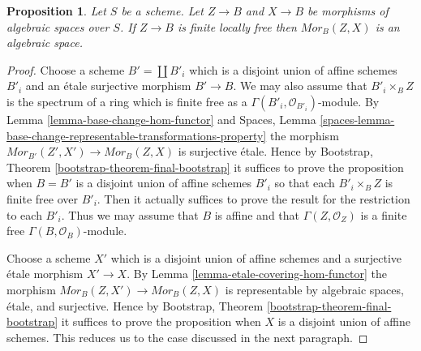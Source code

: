 \documentclass{stacks-project}
\theoremstyle{plain}
\newtheorem{proposition}[subsection]{Proposition}
\theoremstyle{definition}
\theoremstyle{remark}
\numberwithin{equation}{subsection}
\begin{document}
\begin{proposition}
\label{proposition-hom-functor-algebraic-space}
Let $S$ be a scheme. Let $Z \to B$ and $X \to B$ be morphisms of
algebraic spaces over $S$. If $Z \to B$ is finite locally free
then $\mathit{Mor}_B(Z, X)$ is an algebraic space.
\end{proposition}

\begin{proof}
Choose a scheme $B' = \coprod B'_i$ which is a disjoint union of
affine schemes $B'_i$ and an \'etale surjective morphism $B' \to B$.
We may also assume that $B'_i \times_B Z$ is the spectrum of a ring
which is finite free as a $\Gamma(B'_i, \mathcal{O}_{B'_i})$-module.
By
Lemma \ref{lemma-base-change-hom-functor}
and
Spaces, Lemma
\ref{spaces-lemma-base-change-representable-transformations-property}
the morphism $\mathit{Mor}_{B'}(Z', X') \to \mathit{Mor}_B(Z, X)$
is surjective \'etale. Hence by
Bootstrap, Theorem \ref{bootstrap-theorem-final-bootstrap}
it suffices to prove the proposition when $B = B'$ is a disjoint union of
affine schemes $B'_i$ so that each $B'_i \times_B Z$ is finite free
over $B'_i$. Then it actually suffices to prove the result for the restriction
to each $B'_i$. Thus we may assume that $B$ is affine and that
$\Gamma(Z, \mathcal{O}_Z)$ is a finite free $\Gamma(B, \mathcal{O}_B)$-module.

\medskip\noindent
Choose a scheme $X'$ which is a disjoint union of affine schemes and
a surjective \'etale morphism $X' \to X$. By
Lemma \ref{lemma-etale-covering-hom-functor}
the morphism $\mathit{Mor}_B(Z, X') \to \mathit{Mor}_B(Z, X)$
is representable by algebraic spaces, \'etale, and surjective.
Hence by
Bootstrap, Theorem \ref{bootstrap-theorem-final-bootstrap}
it suffices to prove the proposition when $X$ is a disjoint union
of affine schemes. This reduces us to the case discussed in the next
paragraph.


\end{proof}
\end{document}

